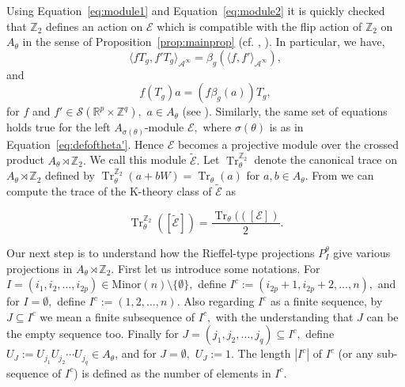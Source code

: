\documentclass[9pt, BCOR=2mm]{amsart}
\numberwithin{equation}{section}
\numberwithin{equation}{section}
\newcommand{\Z}{{\mathbb{Z}}}
\newcommand{\R}{{\mathbb{R}}}
\DeclareMathOperator{\Tr}{Tr}
\begin{document}
	Using Equation~\ref{eq:module1} and  Equation~\ref{eq:module2} it is quickly checked that $\Z_2$ defines an action on $\mathcal{E}$ which is compatible with the flip action of $\Z_2$ on $A_\theta$ in the sense of Proposition~\ref{prop:mainprop} (cf. \cite[Section 7]{CL19}, \cite[Section 3]{Cha21}). In particular, we have, 
	\begin{equation}\label{eq:proj_mod_inner_holds}
  \langle fT_g,f'T_g \rangle_{\mathcal{A}^\infty}=\beta_g(\langle f,f' \rangle_{\mathcal{A}^\infty}),
\end{equation} and 
\begin{equation}\label{eq:proj_mod_T_holds}
f (T_g)a = (f\beta_g(a)) T_g,
\end{equation} 
for $f$ and $f'\in \mathscr{S}(\R^p \times \Z^q),$ $a\in A_\theta$ (see \cite[Equation 3.9, Equation 3.11]{Cha21}). Similarly, the same set of equations holds true for the left  $A_{\sigma(\theta)}$-module $\mathcal{E},$ where $\sigma(\theta)$ is as in Equation~\ref{eq:defoftheta'}. Hence $\mathcal{E}$ becomes a projective module over the crossed product $A_\theta\rtimes \Z_2.$ We call this module $\tilde{\mathcal{E}}.$ Let $\Tr^{\Z_2}_\theta$ denote the canonical trace on $A_\theta\rtimes \Z_2$ defined by  $\Tr^{\Z_2}_\theta(a+bW)=\Tr_\theta(a)$ for $a,b\in A_\theta.$ From \cite[Lemma 4.1]{Cha21} we can compute the trace of the K-theory class of $\tilde{\mathcal{E}}$ as

\begin{equation}\label{eq:trace_of_extended_module}
	\Tr^{\Z_2}_\theta([\tilde{\mathcal{E}}])=\frac{\Tr_\theta(([\mathcal{E}])}{2}.
\end{equation}

	 
	
	 
	 Our next step is to understand how the Rieffel-type projections $P_{I}^{\theta}$ give various projections in $A_\theta\rtimes \Z_2.$ First let us introduce some notations. For $I=(i_1,i_2,\dots,i_{2p}) \in \mathrm{Minor}(n)\setminus \{\emptyset\},$ define $I^c:=(i_{2p}+1,i_{2p}+2,\dots,n),$ and for $I=\emptyset,$ define  $I^c:=(1,2,\dots,n).$  Also regarding $I^c$ as a finite sequence, by $J\subseteq I^c$ we mean a finite subsequence of $I^c,$ with the understanding that $J$ can be the empty sequence too. Finally for $J=(j_1,j_2,\dots,j_q)\subseteq I^c,$ define $U_J:=U_{j_1}U_{j_2}\cdots U_{j_q}\in A_\theta$, and for $J=\emptyset,$ $U_J:=1.$ The length $|I^c|$ of $I^c$ (or any sub-sequence of $I^c$) is defined as the number of elements in $I^c.$
	 
	 
	 
\end{document}
